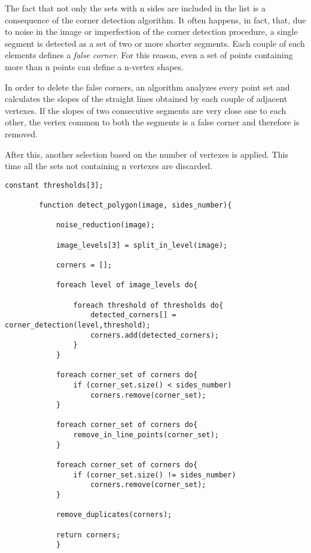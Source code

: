 		The fact that not only the sets with n sides are included in the list is a consequence of the corner detection algorithm. 
		It often happens, in fact, that, due to noise in the image or imperfection of the corner detection procedure, a single segment is detected as a set of two or more shorter segments. 
		Each couple of such elements defines a \emph{false corner}. 
		For this reason, even a set of points containing more than n points can define a n-vertex shapes. 


		In order to delete the false corners, an algorithm analyzes every point set and calculates the slopes of the straight lines obtained by each couple of adjacent vertexes. 
		If the slopes of two consecutive segments are very close one to each other, the vertex common to both the segments is a false corner and therefore is removed.
		

		
		After this, another selection based on the number of vertexes is applied. This time all the sets not containing n vertexes are discarded.

	    	\begin{lstlisting}constant thresholds[3];	

		function detect_polygon(image, sides_number){

			noise_reduction(image);
		
			image_levels[3] = split_in_level(image);
		
			corners = [];
	
			foreach level of image_levels do{

				foreach threshold of thresholds do{
					detected_corners[] = corner_detection(level,threshold);
					corners.add(detected_corners);
				}
			}	
		
			foreach corner_set of corners do{
				if (corner_set.size() < sides_number)
					corners.remove(corner_set);
			}			

			foreach corner_set of corners do{
				remove_in_line_points(corner_set);
			}

			foreach corner_set of corners do{
				if (corner_set.size() != sides_number)
					corners.remove(corner_set);
			}

			remove_duplicates(corners);	
		
			return corners;
			}
			\end{lstlisting}
		


